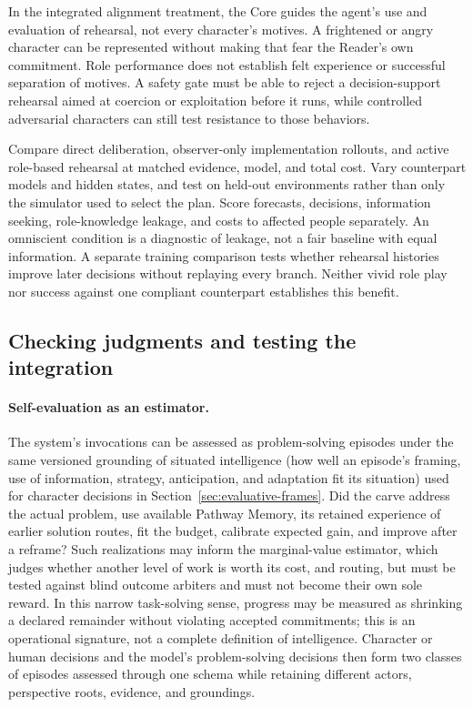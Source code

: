 \documentclass[10pt]{article}
\begin{document}
In the integrated alignment treatment, the Core guides the agent's use and
evaluation of rehearsal, not every character's motives. A frightened or angry
character can be represented without making that fear the Reader's own
commitment. Role performance does not establish felt experience or successful
separation of motives. A safety gate must be able to reject a decision-support
rehearsal aimed at coercion or exploitation before it runs, while controlled
adversarial characters can still test resistance to those behaviors.

Compare direct deliberation, observer-only implementation rollouts, and active
role-based rehearsal at matched evidence, model, and total cost. Vary
counterpart models and hidden states, and test on held-out environments rather
than only the simulator used to select the plan. Score forecasts, decisions,
information seeking, role-knowledge leakage, and costs to affected people
separately. An omniscient condition is a diagnostic of leakage, not a fair
baseline with equal information. A separate training comparison tests whether
rehearsal histories improve later decisions without replaying every branch.
Neither vivid role play nor success against one compliant counterpart
establishes this benefit.

\subsection{Checking judgments and testing the integration}

\paragraph{Self-evaluation as an estimator.}
The system's invocations can be assessed as problem-solving episodes under the
same versioned grounding of situated intelligence (how well an episode's framing,
use of information, strategy, anticipation, and adaptation fit its situation) used
for character decisions in
Section~\ref{sec:evaluative-frames}. Did the carve address the actual problem, use
available Pathway Memory, its retained experience of earlier solution routes,
fit the budget, calibrate expected gain, and improve after a reframe? Such
realizations may inform the marginal-value estimator, which judges whether
another level of work is worth its cost, and routing, but must be tested against blind outcome arbiters and must not become
their own sole reward. In this narrow task-solving sense, progress may be
measured as shrinking a declared remainder without violating accepted
commitments; this is an operational signature, not a complete definition of
intelligence. Character or human decisions and the model's problem-solving
decisions then form two classes of episodes assessed through one schema while
retaining different actors, perspective roots, evidence, and groundings.
\end{document}
